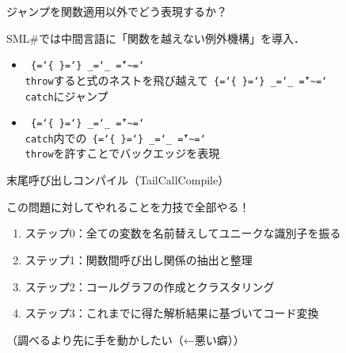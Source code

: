\documentclass[aspectratio=169,t,dvipdfmx,12pt]{beamer}
\newcommand\codestyle{%
  \ttfamily
  \chardef\{=`\{
  \chardef\}=`\}
  \chardef\_=`\_
  \chardef\~=`\~
  \chardef\/=`\\
  \frenchspacing}
\newcommand\code[1]{\texttt{\protect\codestyle #1}}
\newcommand\KW[1]{{\color{KW}#1}}
\newcommand\ID[1]{{\color{ID}#1}}
\newcommand\focus[1]{{\color{focus}\underline{#1}}}
\newcommand\smlsharp{SML\#}
\begin{document}
\begin{frame}{ジャンプを関数適用以外でどう表現するか？}

\smlsharp{}では中間言語に「関数を越えない例外機構」を導入．
\begin{itemize}
\item \code{throw}すると式のネストを飛び越えて\code{catch}にジャンプ
\item \code{catch}内での\code{throw}を許すことでバックエッジを表現
\end{itemize}

\begin{center}
\end{center}

\end{frame}

\begin{frame}{末尾呼び出しコンパイル（TailCallCompile）}

この問題に対してやれることを力技で全部やる！

\begin{enumerate}
\item ステップ0：全ての変数を名前替えしてユニークな識別子を振る
\item ステップ1：関数間呼び出し関係の抽出と整理
\item ステップ2：コールグラフの作成とクラスタリング
\item ステップ3：これまでに得た解析結果に基づいてコード変換
\end{enumerate}

\bigskip
{\footnotesize （調べるより先に手を動かしたい（←悪い癖））}

\end{frame}
\end{document}
